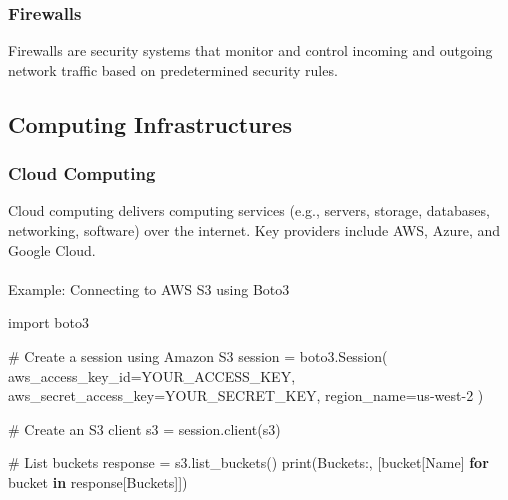 \documentclass[
  letterpaper,
  DIV=11,
  numbers=noendperiod]{scrreprt}
\makeatletter
\let\oldparagraph\paragraph
\renewcommand{\paragraph}{
    \@ifstar
      \xxxParagraphStar
      \xxxParagraphNoStar
  }
\newcommand{\xxxParagraphStar}[1]{\oldparagraph*{#1}\mbox{}}
\newcommand{\xxxParagraphNoStar}[1]{\oldparagraph{#1}\mbox{}}
\newenvironment{Shaded}{\begin{snugshade}}{\end{snugshade}}
\newcommand{\BuiltInTok}[1]{\textcolor[rgb]{0.00,0.23,0.31}{#1}}
\newcommand{\CommentTok}[1]{\textcolor[rgb]{0.37,0.37,0.37}{#1}}
\newcommand{\ControlFlowTok}[1]{\textcolor[rgb]{0.00,0.23,0.31}{\textbf{#1}}}
\newcommand{\ImportTok}[1]{\textcolor[rgb]{0.00,0.46,0.62}{#1}}
\newcommand{\KeywordTok}[1]{\textcolor[rgb]{0.00,0.23,0.31}{\textbf{#1}}}
\newcommand{\NormalTok}[1]{\textcolor[rgb]{0.00,0.23,0.31}{#1}}
\newcommand{\OperatorTok}[1]{\textcolor[rgb]{0.37,0.37,0.37}{#1}}
\newcommand{\StringTok}[1]{\textcolor[rgb]{0.13,0.47,0.30}{#1}}
\makeatother
\begin{document}
\subsubsection{Firewalls}\label{firewalls}

Firewalls are security systems that monitor and control incoming and
outgoing network traffic based on predetermined security rules.

\subsection{Computing Infrastructures}\label{computing-infrastructures}

\subsubsection{Cloud Computing}\label{cloud-computing}

Cloud computing delivers computing services (e.g., servers, storage,
databases, networking, software) over the internet. Key providers
include AWS, Azure, and Google Cloud.

\paragraph{Example: Connecting to AWS S3 using
Boto3}\label{example-connecting-to-aws-s3-using-boto3}

\begin{Shaded}
\begin{Highlighting}[]
\ImportTok{import}\NormalTok{ boto3}

\CommentTok{\# Create a session using Amazon S3}
\NormalTok{session }\OperatorTok{=}\NormalTok{ boto3.Session(}
\NormalTok{    aws\_access\_key\_id}\OperatorTok{=}\StringTok{\textquotesingle{}YOUR\_ACCESS\_KEY\textquotesingle{}}\NormalTok{,}
\NormalTok{    aws\_secret\_access\_key}\OperatorTok{=}\StringTok{\textquotesingle{}YOUR\_SECRET\_KEY\textquotesingle{}}\NormalTok{,}
\NormalTok{    region\_name}\OperatorTok{=}\StringTok{\textquotesingle{}us{-}west{-}2\textquotesingle{}}
\NormalTok{)}

\CommentTok{\# Create an S3 client}
\NormalTok{s3 }\OperatorTok{=}\NormalTok{ session.client(}\StringTok{\textquotesingle{}s3\textquotesingle{}}\NormalTok{)}

\CommentTok{\# List buckets}
\NormalTok{response }\OperatorTok{=}\NormalTok{ s3.list\_buckets()}
\BuiltInTok{print}\NormalTok{(}\StringTok{\textquotesingle{}Buckets:\textquotesingle{}}\NormalTok{, [bucket[}\StringTok{\textquotesingle{}Name\textquotesingle{}}\NormalTok{] }\ControlFlowTok{for}\NormalTok{ bucket }\KeywordTok{in}\NormalTok{ response[}\StringTok{\textquotesingle{}Buckets\textquotesingle{}}\NormalTok{]])}
\end{Highlighting}
\end{Shaded}
\end{document}
